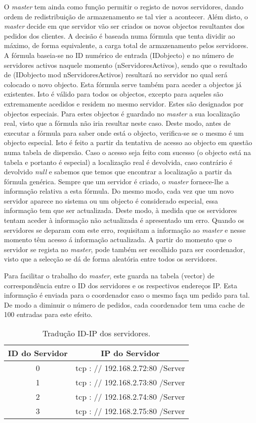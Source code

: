 O \textit{master} tem ainda como função permitir o registo de novos servidores, dando ordem de redistribuição de armazenamento se tal vier a acontecer. Além disto, o \textit{master} decide em que servidor vão ser criados os novos objectos resultantes dos pedidos dos clientes. A decisão é baseada numa fórmula que tenta dividir ao máximo, de forma equivalente, a carga total de armazenamento pelos servidores. A fórmula baseia-se no ID numérico de entrada (IDobjecto) e no número de servidores activos naquele momento (nServidoresActivos), sendo que o resultado de (IDobjecto mod nServidoresActivos) resultará no servidor no qual será colocado o novo objecto. Esta fórmula serve também para aceder a objectos já existentes. Isto é válido para todos os objectos, excepto para aqueles são extremamente acedidos e residem no mesmo servidor. Estes são designados por objectos especiais. Para estes objectos é guardado no \textit{master} a sua localização real, visto que a fórmula não iria resultar neste caso. Deste modo, antes de executar a fórmula para saber onde está o objecto, verifica-se se o mesmo é um objecto especial. Isto é feito a partir da tentativa de acesso ao objecto em questão numa tabela de dispersão. Caso o acesso seja feito com sucesso (o objecto está na tabela e portanto é especial) a localização real é devolvida, caso contrário é devolvido \textit{null} e sabemos que temos que encontrar a localização a partir da fórmula genérica. Sempre que um servidor é criado, o \textit{master} fornece-lhe a informação relativa a esta fórmula. Do mesmo modo, cada vez que um novo servidor aparece no sistema ou um objecto é considerado especial, essa informação tem que ser actualizada. Deste modo, à medida que os servidores tentam aceder à informação não actualizada é apresentado um erro. Quando os servidores se deparam com este erro, requisitam a informação ao \textit{master} e nesse momento têm acesso á informação actualizada.  A partir do momento que o servidor se regista no \textit{master},  pode também ser escolhido para ser coordenador, visto que a selecção se dá de forma aleatória entre todos os servidores.

Para facilitar o trabalho do \textit{master}, este guarda na tabela (vector) de correspondência entre o ID dos servidores e os respectivos endereços IP. Esta informação é enviada para o coordenador caso o mesmo faça um pedido para tal. De modo a diminuir o número de pedidos, cada coordenador tem uma cache de 100 entradas para este efeito.

\begin{table}
\centering
\begin{tabular}{c|c}
ID do Servidor & IP do Servidor \\\hline
0 & tcp : // 192.168.2.72:80 /Server \\
1 & tcp : // 192.168.2.73:80 /Server \\
2 & tcp : // 192.168.2.74:80 /Server \\
3 & tcp : // 192.168.2.75:80 /Server \\
\end{tabular}
\caption{\label{tab:widgets}Tradução ID-IP dos servidores.}
\end{table}